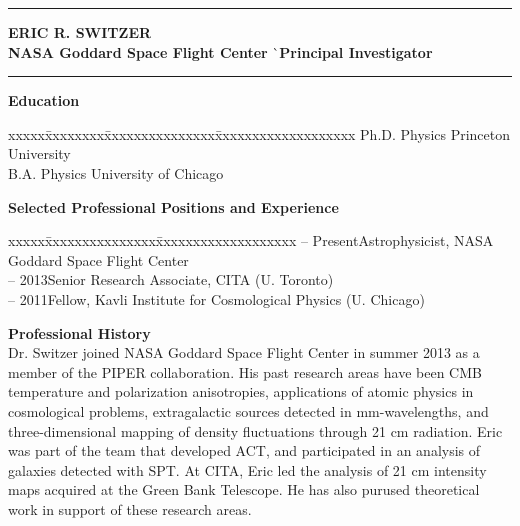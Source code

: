 \documentclass[12pt]{article}
\begin{document}
\hrule height .7pt
\vspace{-3mm}
\noindent
\begin{tabbing}
{\bf ERIC R. SWITZER} \` \\
\small{{\bf NASA Goddard Space Flight Center}} \` \small{{\bf Principal Investigator}} \\
\end{tabbing}
\vspace{-9mm}
\hrule height .7pt

\vspace{5mm}
\small{
\noindent
{\bf Education}
\vspace{-3mm}
\begin{tabbing}
xxxxx\=xxxxxxxx\=xxxxxxxxxxxxxxx\=xxxxxxxxxxxxxxxxxxx\kill
{} \> Ph.D. Physics \> Princeton University \\
 \> B.A. Physics \> University of Chicago \\
\end{tabbing}}

\vspace{-5mm}
\small{
\noindent
{\bf Selected Professional Positions and Experience}
\vspace{-3mm}
\begin{tabbing}
xxxxx\=xxxxxxxxxxxxxxx\=xxxxxxxxxxxxxxxxxxx\kill
{} -- Present\>Astrophysicist, NASA Goddard Space Flight Center \\
 -- 2013\>Senior Research Associate, CITA (U. Toronto) \\
 -- 2011\>Fellow, Kavli Institute for Cosmological Physics (U. Chicago) \\
\end{tabbing}}

\vspace{-2mm}
\small{
\noindent
{\bf Professional History}\\
Dr. Switzer joined NASA Goddard Space Flight Center in summer 2013 as a member
of the PIPER collaboration. His past research areas have been CMB temperature
and polarization anisotropies, applications of atomic physics in cosmological
problems, extragalactic sources detected in mm-wavelengths, and
three-dimensional mapping of density fluctuations through 21 cm radiation. Eric
was part of the team that developed ACT, and participated in an analysis of
galaxies detected with SPT. At CITA, Eric led the analysis of 21 cm intensity
maps acquired at the Green Bank Telescope. He has also purused theoretical work
in support of these research areas.
}

\vspace{5mm}
\begin{list}{}{%
\setlength{\topsep}{0pt}%
\setlength{\leftmargin}{0.1in}%
\setlength{\listparindent}{-0.1in}%
\setlength{\itemindent}{-0.1in}%
\setlength{\parsep}{\parskip}%
}%
%

\end{list}
\end{document}
